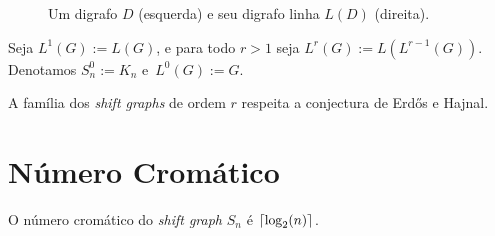 \begin{figure}[H]
\centering
{}
\caption{Um digrafo $D$ (esquerda) e seu digrafo linha $L(D)$ (direita).}
\label{fig:shiftlinedigraph}
\end{figure}

Seja $L^1(G) := L(G)$, e para todo $r>1$ seja $L^r(G) := L(L^{r-1}(G))$. Denotamos $S_n^0 := K_n$ e~$L^0(G) := G$. 

\begin{teorema}\label{shiftteo}
A família dos \textit{shift graphs} de ordem $r$ respeita a conjectura de Erd\H{o}s e Hajnal. \cite{gabor2018cepa}
\end{teorema}


\section{Número Cromático}

\begin{afirmacao}\label{shiftchraff1}
O número cromático do \textit{shift graph} $S_n$ é $\lceil\log_2(n)\rceil$.
\end{afirmacao}

